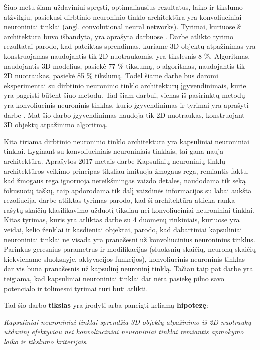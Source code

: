 Šiuo metu šiam uždaviniui spręsti, optimaliausius  rezultatus, laiko ir tikslumo atžvilgiu, pasiekusi dirbtinio neuroninio tinklo architektūra yra konvoliuciniai neuroniniai tinklai (angl. convolutional neural networks). Tyrimai, kuriuose ši architektūra buvo išbandyta, yra aprašyta darbuose \cite{cnnExp1, cnnExp2}. Darbe \cite{dbnExp} atlikto tyrimo rezultatai parodo, kad pateiktas sprendimas, kuriame 3D objektų atpažinimas yra konstruojamas naudojantis tik 2D nuotraukomis, yra tikslesnis 8 \%. Algoritmas, naudojantis 3D modelius, pasiekė 77 \% tikslumą, o algoritmas, naudojantis tik 2D nuotraukas, pasiekė 85 \% tikslumą. Todėl šiame darbe bus daromi eksperimentai su dirbtinio neuroninio tinklo architektūrų įgyvendinimais, kurie yra pagrįsti būtent šiuo metodu. Tad šiam darbui, vienas iš pasirinktų metodų yra konvoliucinis neuroninis tinklas, kurio įgyvendinimas ir tyrimai yra aprašyti darbe \cite{cnnExp1}. Mat šio darbo įgyvendinimas naudoja tik 2D nuotraukas, konstruojant 3D objektų atpažinimo algoritmą.

Kita tiriama dirbtinio neuroninio tinklo architektūra yra kapsuliniai neuroniniai tinklai. Lyginant su konvoliuciniais neuroniniais tinklais, tai gana nauja architektūra. Aprašytos 2017 metais \cite{capsNet} darbe Kapsulinių neuroninių tinklų architektūros veikimo principas tiksliau imituoja žmogaus rega, remiantis faktu, kad žmogaus rega ignoruoja nereikšmingas vaizdo detales, naudodama tik seką fokusuotų taškų, taip apdorodama tik dalį vaizdinės informacijos su labai aukšta rezoliucija. \cite{capsNet} darbe atliktas tyrimas parodo, kad ši architektūra atlieka ranka rašytų skaičių klasifikavimo užduotį tiksliau nei konvoliuciniai neuroniniai tinklai. Kitas tyrimas, kuris yra atliktas darbe \cite{capsCNN} su 4 duomenų rinkiniais, kuriuose yra veidai, kelio ženklai ir kasdieniai objektai, parodo, kad dabartiniai kapsuliniai neuroniniai tinklai ne visada yra pranašesni už konvoliucinius neuroninius tinklus. Parinkus geresnius parametrus ir modifikacijas (sluoksnių skaičių, neuronų skaičių kiekviename sluoksnyje, aktyvacijos funkcijos), konvoliucinis neuroninis tinklas dar vis būna pranašesnis už kapsulinį neuroninį tinklą. Tačiau taip pat darbe \cite{capsCNN} yra teigiama, kad kapsuliniai neuroniniai tinklai dar nėra pasiekę pilno savo potencialo ir tolimesni tyrimai turi būti atlikti.

Tad šio darbo \textbf{tikslas} yra įrodyti arba paneigti keliamą \textbf{hipotezę}:

\textit{Kapsuliniai neuroniniai tinklai sprendžia 3D objektų atpažinimo iš 2D nuotraukų uždavinį efektyviau nei konvoliuciniai neuroniniai tinklai remiantis apmokymo laiko ir tikslumo kriterijais}.


